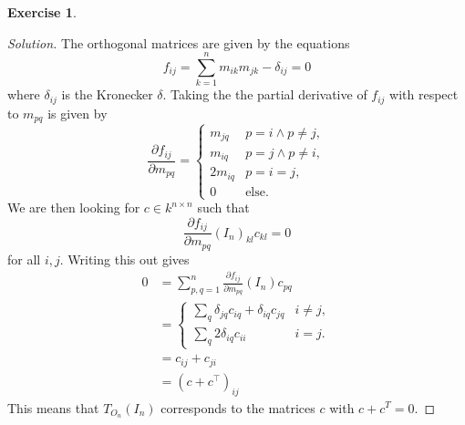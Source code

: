 \documentclass{article}
\renewcommand{\qedsymbol}{\raisebox{-0.5cm}{}}
\newenvironment{solution}{\begin{proof}[Solution]\renewcommand\qedsymbol{}}{\end{proof}}
\theoremstyle{definition}
\newtheorem{question}{Exercise}
\begin{document}
\begin{question}
\begin{enumerate}[(i)]
              \begin{solution}
                  The orthogonal matrices are given by the equations
                  \[
                      f_{ij}=\sum_{k=1}^{n}m_{ik}m_{jk}-\delta_{ij}=0
                  \]
                  where \(\delta_{ij}\) is the Kronecker \(\delta\). Taking the
                  the partial derivative of \(f_{ij}\) with respect to
                  \(m_{pq}\) is given by
                  \[
                      \frac{\partial f_{ij}}{\partial m_{pq}}=\begin{cases}
                          m_{jq}  & p=i\wedge p\neq j, \\
                          m_{iq}  & p=j\wedge p\neq i, \\
                          2m_{iq} & p=i=j,             \\
                          0       & \text{else}.
                      \end{cases}
                  \]
                  We are then looking for \(c\in k^{n\times n}\) such that
                  \[
                      \frac{\partial f_{ij}}{\partial m_{pq}}(I_{n})_{kl}c_{kl}=0
                  \]
                  for all \(i,j\). Writing this out gives
                  \begin{align*}
                      0 & =\sum_{p,q=1}^{n}\frac{\partial f_{ij}}{\partial m_{pq}}(I_{n})c_{pq} \\
                        & =\begin{cases}
                          \sum_{q}\delta_{jq}c_{iq}+\delta_{iq}c_{jq} & i\neq j, \\
                          \sum_{q}2\delta_{iq}c_{ii}                  & i=j.
                      \end{cases}                                            \\
                        & =c_{ij}+c_{ji}                                                        \\
                        & =(c+c^{\top})_{ij}
                  \end{align*}
                  This means that \(T_{O_{n}}(I_{n})\) corresponds to the
                  matrices \(c\) with \(c+c^{T}=0\).
              \end{solution}
    \end{enumerate}
\end{question}
\end{document}
